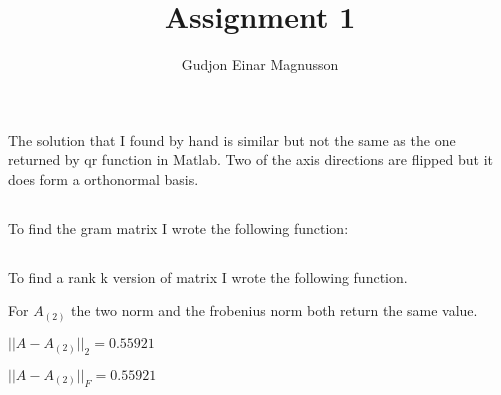 \documentclass[12pt]{article}
\begin{document}


\title{Assignment 1}
\author{Gudjon Einar Magnusson}

\maketitle


\section{}


\section{}

\subsection{}
The solution that I found by hand is similar but not the same as the one returned by qr function in Matlab.
Two of the axis directions are flipped but it does form a orthonormal basis.

\subsection{}

To find the gram matrix I wrote the following function:



\subsection{}
To find a rank k version of matrix I wrote the following function.




For $A_{(2)}$ the two norm and the frobenius norm both return the same value.

\begin{center}
$\lvert\lvert A - A_{(2)} \rvert\rvert_{2} = 0.55921$

$\lvert\lvert A - A_{(2)} \rvert\rvert_{F} = 0.55921$
\end{center}
\end{document}
